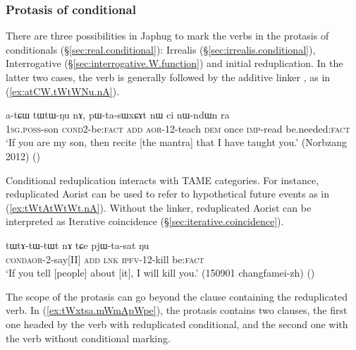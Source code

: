 \subsubsection{Protasis of conditional} \label{sec:redp.protasis}
There are three possibilities in Japhug to mark the verbs in the protasis of conditionals (§\ref{sec:real.conditional}): Irrealis (§\ref{sec:irrealis.conditional}), Interrogative  (§\ref{sec:interrogative.W.function}) and initial reduplication. In the latter two cases, the verb is generally followed by the additive linker , as in (\ref{ex:atCW.tWtWNu.nA}).
 
\begin{exe}
\ex \label{ex:atCW.tWtWNu.nA}
\gll   a-tɕɯ tɯ\redp{}tɯ-ŋu nɤ, pɯ-ta-sɯxɕɤt nɯ ci nɯ-ndɯn ra \\
\textsc{1sg}.\textsc{poss}-son \textsc{cond}\redp{}2-be:\textsc{fact} \textsc{add} \textsc{aor}-1\fl{}2-teach \textsc{dem} once \textsc{imp}-read be.needed:\textsc{fact} \\
\glt `If you are my son, then recite [the mantra] that I have taught you.' (Norbzang 2012)
()
\end{exe}

Conditional reduplication interacts with TAME categories. For instance, reduplicated Aorist can be used to refer to hypothetical future events as in (\ref{ex:tWtAtWtWt.nA}). Without the  linker, reduplicated Aorist can be interpreted as Iterative coincidence (§\ref{sec:iterative.coincidence}).

\begin{exe}
\ex \label{ex:tWtAtWtWt.nA}
\gll tɯ\redp{}tɤ-tɯ-tɯt nɤ tɕe pjɯ-ta-sat ŋu \\
\textsc{cond}\redp{}\textsc{aor}-2-say[II] \textsc{add} \textsc{lnk} \textsc{ipfv}-1\fl{}2-kill be:\textsc{fact} \\
\glt `If you tell [people] about [it], I will kill you.' (150901 changfamei-zh) ()
\end{exe}

The scope of the protasis can go beyond the clause containing the reduplicated verb. In (\ref{ex:tWxtsa.mWmApWpe}), the protasis contains two clauses, the first one headed by the verb  with reduplicated conditional, and the second one with the verb  without conditional marking.

